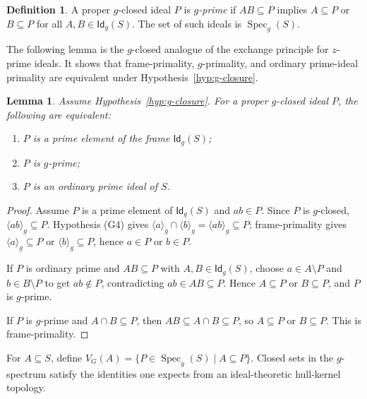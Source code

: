 \documentclass[11pt,leqno]{amsart}
\theoremstyle{plain}
\newtheorem{lemma}[theorem]{Lemma}
\theoremstyle{definition}
\newtheorem{definition}{Definition}[section]
\theoremstyle{remark}
\numberwithin{equation}{section}
\DeclareMathOperator{\Spec}{Spec}
\newcommand{\GCl}{\mathsf{Id}_{g}}
\newcommand{\ideal}[1]{\langle #1\rangle}
\begin{document}
\begin{definition}\label{def:g-prime}
A proper $g$-closed ideal $P$ is \emph{$g$-prime} if
$AB\subseteq P$ implies $A\subseteq P$ or $B\subseteq P$
for all $A,B\in\GCl(S)$.
The set of such ideals is $\Spec_g(S)$.
\end{definition}

The following lemma is the $g$-closed analogue of the exchange
principle for $z$-prime ideals.
It shows that frame-primality, $g$-primality, and ordinary
prime-ideal primality are equivalent under
Hypothesis~\ref{hyp:g-closure}.

\begin{lemma}\label{exchange-principal-g-prime}
Assume Hypothesis~\ref{hyp:g-closure}.
For a proper $g$-closed ideal $P$, the following are equivalent:
\begin{enumerate}[label=\upshape(\roman*)]
\item $P$ is a prime element of the frame $\GCl(S)$;
\item $P$ is $g$-prime;
\item $P$ is an ordinary prime ideal of $S$.
\end{enumerate}
\end{lemma}
\begin{proof}
Assume $P$ is a prime element of $\GCl(S)$ and $ab\in P$.
Since $P$ is $g$-closed, $\ideal{ab}_g\subseteq P$.
Hypothesis (G4) gives
$\ideal{a}_g\cap\ideal{b}_g=\ideal{ab}_g\subseteq P$;
frame-primality gives $\ideal{a}_g\subseteq P$ or
$\ideal{b}_g\subseteq P$, hence $a\in P$ or $b\in P$.

If $P$ is ordinary prime and $AB\subseteq P$ with $A,B\in\GCl(S)$,
choose $a\in A\setminus P$ and $b\in B\setminus P$ to get
$ab\notin P$, contradicting $ab\in AB\subseteq P$.
Hence $A\subseteq P$ or $B\subseteq P$, and $P$ is $g$-prime.

If $P$ is $g$-prime and $A\cap B\subseteq P$, then
$AB\subseteq A\cap B\subseteq P$, so $A\subseteq P$ or $B\subseteq P$.
This is frame-primality.
\end{proof}

For $A\subseteq S$, define $V_G(A)=\{P\in\Spec_g(S)\mid A\subseteq P\}$.
Closed sets in the $g$-spectrum satisfy the identities one expects
from an ideal-theoretic hull-kernel topology.
\end{document}
